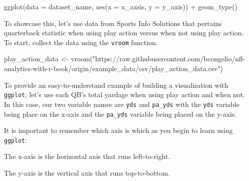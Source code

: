 \documentclass[
  letterpaper,
]{krantz}
\newenvironment{Shaded}{\begin{snugshade}}{\end{snugshade}}
\newcommand{\AttributeTok}[1]{\textcolor[rgb]{0.40,0.45,0.13}{#1}}
\newcommand{\FunctionTok}[1]{\textcolor[rgb]{0.28,0.35,0.67}{#1}}
\newcommand{\NormalTok}[1]{\textcolor[rgb]{0.00,0.23,0.31}{#1}}
\newcommand{\OtherTok}[1]{\textcolor[rgb]{0.00,0.23,0.31}{#1}}
\newcommand{\SpecialCharTok}[1]{\textcolor[rgb]{0.37,0.37,0.37}{#1}}
\newcommand{\StringTok}[1]{\textcolor[rgb]{0.13,0.47,0.30}{#1}}
\begin{document}
\begin{Shaded}
\begin{Highlighting}[]
\FunctionTok{ggplot}\NormalTok{(}\AttributeTok{data =} \StringTok{\textquotesingle{}dataset\_name\textquotesingle{}}\NormalTok{, }\FunctionTok{aes}\NormalTok{(}\AttributeTok{x =} \StringTok{\textquotesingle{}x\_axsis\textquotesingle{}}\NormalTok{, }\AttributeTok{y =} \StringTok{\textquotesingle{}y\_axis\textquotesingle{}}\NormalTok{)) }\SpecialCharTok{+}
  \FunctionTok{geom\_type}\NormalTok{()}
\end{Highlighting}
\end{Shaded}

To showcase this, let's use data from Sports Info Solutions that
pertains quarterback statistic when using play action versus when not
using play action. To start, collect the data using the \texttt{vroom}
function.

\begin{Shaded}
\begin{Highlighting}[]
\NormalTok{play\_action\_data }\OtherTok{\textless{}{-}}
  \FunctionTok{vroom}\NormalTok{(}\StringTok{"https://raw.githubusercontent.com/bcongelio/nfl{-}analytics{-}with{-}r{-}book/origin/example\_data/csv/play\_action\_data.csv"}\NormalTok{)}
\end{Highlighting}
\end{Shaded}

To provide an easy-to-understand example of building a visualization
with \texttt{ggplot}, let's use each QB's total yardage when using play
action and when not. In this case, our two variable names are
\texttt{yds} and \texttt{pa\_yds} with the \texttt{yds} variable being
place on the x-axis and the \texttt{pa\_yds} variable being placed on
the y-axis.

\begin{tcolorbox}[enhanced jigsaw, left=2mm, toprule=.15mm, opacitybacktitle=0.6, leftrule=.75mm, bottomrule=.15mm, colbacktitle=quarto-callout-tip-color!10!white, breakable, colback=white, bottomtitle=1mm, toptitle=1mm, title=\textcolor{quarto-callout-tip-color}{\faLightbulb}\hspace{0.5em}{Tip}, coltitle=black, titlerule=0mm, arc=.35mm, opacityback=0, colframe=quarto-callout-tip-color-frame, rightrule=.15mm]

It is important to remember which axis is which as you begin to learn
using \texttt{ggplot}:

The x-axis is the horizontal axis that runs left-to-right.

The y-axis is the vertical axis that runs top-to-bottom.

\end{tcolorbox}
\end{document}
